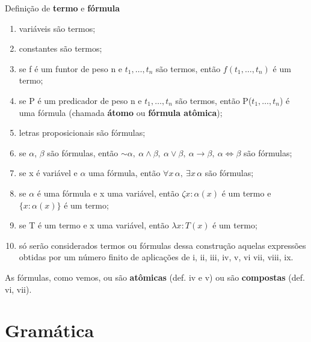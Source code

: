 \bigskip
\noindent Definição de \textbf{termo} e \textbf{fórmula}

\begin{enumerate}[label=\roman*)]
    \item variáveis são termos;
    \item constantes são termos;
    \item se f é um funtor de peso n e $t_1, \dots, t_n$ são termos, então $f(t_1, \dots, t_n)$ é um termo;
    \item se P é um predicador de peso n e $t_1, \dots, t_n$ são termos, então P($t_1, \dots, t_n$) é uma fórmula (chamada \textbf{átomo} ou \textbf{fórmula atômica});
    \item letras proposicionais são fórmulas;
    \item se $\alpha$, $\beta$ são fórmulas, então $\sim \alpha,\ \alpha \wedge \beta,\ \alpha \vee \beta,\ \alpha \to \beta,\ \alpha \iff \beta$ são fórmulas;
    \item se x é variável e $\alpha$ uma fórmula, então $\forall x \, \alpha,\ \exists x \, \alpha$ são fórmulas;
    \item se $\alpha$ é uma fórmula e x uma variável, então $\zeta x \colon \alpha(x)$ é um termo e $\{ x \colon \alpha(x)\}$ é um termo;
    \item se T é um termo e x uma variável, então $\lambda x \colon T(x)$ é um termo;
    \item só serão considerados termos ou fórmulas dessa construção aquelas expressões obtidas por um número finito de aplicações de i, ii, iii, iv, v, vi vii, viii, ix.
\end{enumerate}

As fórmulas, como vemos, ou são \textbf{atômicas} (def. iv e v) ou são \textbf{compostas} (def. vi, vii).

\section{Gramática}

